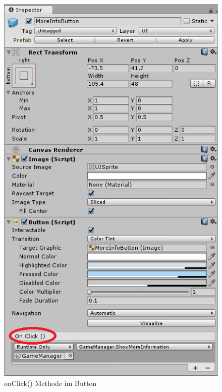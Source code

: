 \begin{figure}
\centering
\includegraphics[scale=0.9]{bilder/OnClick2.PNG}
\caption{onClick() Methode im Button}
\label{onClickPc}
\end{figure}
